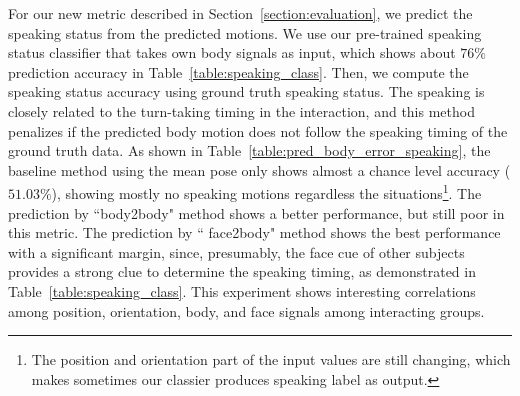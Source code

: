 For our new metric described in Section~\ref{section:evaluation}, we predict the speaking status from the predicted motions. We use our pre-trained speaking status classifier that takes own body signals as input, which shows about $76\%$ prediction accuracy in Table~\ref{table:speaking_class}. Then, we compute the speaking status accuracy using ground truth speaking status. The speaking is closely related to the turn-taking timing in the interaction, and this method penalizes if the predicted body motion does not follow the speaking timing of the ground truth data. As shown in Table~\ref{table:pred_body_error_speaking}, the baseline method using the mean pose only shows almost a chance level accuracy ($51.03\%$), showing mostly no speaking motions regardless the situations\footnote{The position and orientation part of the input values are still changing, which makes sometimes our classier produces speaking label as output.}. The prediction by ``body2body" method shows a better performance, but still poor in this metric. The prediction by `` face2body" method shows the best performance with a significant margin, since, presumably, the face cue of other subjects provides a strong clue to determine the speaking timing, as demonstrated in Table~\ref{table:speaking_class}. This experiment shows interesting correlations among position, orientation, body, and face signals among interacting groups. %




